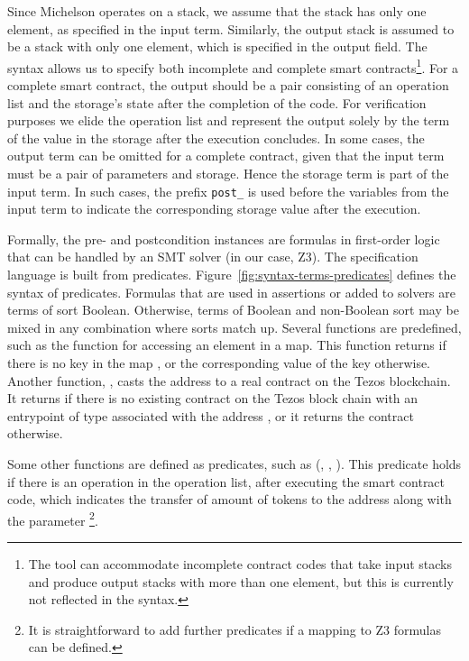 \documentclass[a4paper,USenglish,cleveref, autoref,anonymous]{lipics-v2021}
\begin{document}
Since Michelson operates on a stack, we assume that the stack has only one
element, as specified in the input term. Similarly, the output
stack is assumed to be a stack with only one element, which is
specified in the output field. The syntax allows us to specify both
incomplete and complete smart contracts\footnote{The tool can
  accommodate incomplete contract codes that take input stacks and
  produce output stacks with more than one element, but this is
  currently not reflected in the syntax.}. For a complete smart
contract, the output should be a pair consisting of an operation list
and the storage's state after the completion of the code.  For
verification purposes we elide the operation list and represent the
output solely by the term of the value in the storage after the
execution concludes. In some cases, the output term can be omitted for
a complete contract, given that the input term must be a pair 
of parameters and storage. Hence the storage term is part of the
input term. In such cases, the prefix \lstinline/post_/ is used
before the variables from the input term to indicate the corresponding
storage value after the execution.

Formally, the pre- and postcondition instances are formulas in
first-order logic that can be handled by an SMT solver (in our case,
Z3). The specification language is built from
predicates. Figure~\ref{fig:syntax-terms-predicates} defines the
syntax of predicates. Formulas that are used in assertions or added to solvers are terms of sort Boolean. Otherwise, terms of
Boolean and non-Boolean sort may be mixed in any combination where
sorts match up. Several functions are predefined, such as the function
 for accessing an element in a map. This
function returns  if there is no key  in the map
, or the corresponding value of the key otherwise. Another
function, , casts the address 
to a real contract on the Tezos blockchain. It returns  if
there is no existing contract on the Tezos block chain with an
entrypoint of type  associated with the address , or
it returns the contract otherwise.

Some other functions are defined as predicates, such as
 (, , ). This
predicate holds if there is an operation in the operation list, after
executing the smart contract code, which indicates the transfer of
 amount of tokens to the address  along with the
parameter \footnote{It is straightforward to add further
  predicates if a mapping to Z3 formulas can be defined.}. 
\end{document}
